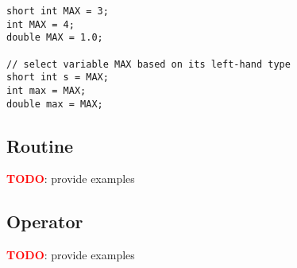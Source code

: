 \begin{frame}
\frametitle{}
\begin{lstlisting}
short int MAX = 3;
int MAX = 4;
double MAX = 1.0;

// select variable MAX based on its left-hand type
short int s = MAX;
int max = MAX;
double max = MAX;
\end{lstlisting}
\end{frame}

\subsection{Routine}
\textbf{\textcolor{red}{TODO}}: provide examples

\subsection{Operator}
\textbf{\textcolor{red}{TODO}}: provide examples

